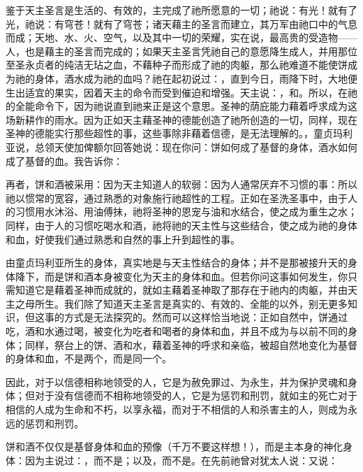 鉴于天主圣言是生活的、有效的，主完成了祂所愿意的一切；祂说：有光！就有了光，祂说：有穹苍！就有了穹苍；诸天藉主的圣言而建立，其万军由祂口中的气息而成；天地、水、火、空气，以及其中一切的荣耀，实在说，最高贵的受造物——人，也是藉主的圣言而完成的；如果天主圣言凭祂自己的意愿降生成人，并用那位至圣永贞者的纯洁无玷之血，不藉种子而形成了祂的肉躯，那么祂难道不能使饼成为祂的身体，酒水成为祂的血吗？祂在起初说过：，直到今日，雨降下时，大地便生出适宜的果实，因着天主的命令而受到催迫和增强。天主说：，和。所以，在祂的全能命令下，因为祂说直到祂来正是这个意思。圣神的荫庇能力藉着呼求成为这场新耕作的雨水。因为正如天主藉圣神的德能创造了祂所创造的一切，同样，现在圣神的德能实行那些超性的事，这些事除非藉着信德，是无法理解的。，童贞玛利亚说，总领天使加俾额尔回答她说：现在你问：饼如何成了基督的身体，酒水如何成了基督的血。我告诉你：\par

再者，饼和酒被采用：因为天主知道人的软弱：因为人通常厌弃不习惯的事：所以祂以惯常的宽容，通过熟悉的对象施行祂超性的工程。正如在圣洗圣事中，由于人的习惯用水沐浴、用油傅抹，祂将圣神的恩宠与油和水结合，使之成为重生之水；同样，由于人的习惯吃喝水和酒，祂将祂的天主性与这些结合，使之成为祂的身体和血，好使我们通过熟悉和自然的事上升到超性的事。\par

由童贞玛利亚所生的身体，真实地是与天主性结合的身体；并不是那被接升天的身体降下，而是饼和酒本身被变化为天主的身体和血。但若你问这事如何发生，你只需知道它是藉着圣神而成就的，就如主藉着圣神取了那存在于祂内的肉躯，并由天主之母所生。我们除了知道天主圣言是真实的、有效的、全能的以外，别无更多知识，但这事的方式是无法探究的。然而可以这样恰当地说：正如自然中，饼通过吃，酒和水通过喝，被变化为吃者和喝者的身体和血，并且不成为与以前不同的身体；同样，祭台上的饼、酒和水，藉着圣神的呼求和亲临，被超自然地变化为基督的身体和血，不是两个，而是同一个。\par

因此，对于以信德相称地领受的人，它是为赦免罪过、为永生，并为保护灵魂和身体；但对于没有信德而不相称地领受的人，它是为惩罚和刑罚，就如主的死亡对于相信的人成为生命和不朽，以享永福，而对于不相信的人和杀害主的人，则成为永远的惩罚和刑罚。\par

饼和酒不仅仅是基督身体和血的预像（千万不要这样想！），而是主本身的神化身体：因为主说过：，而不是；以及，而不是。在先前祂曾对犹太人说：又说：\par

